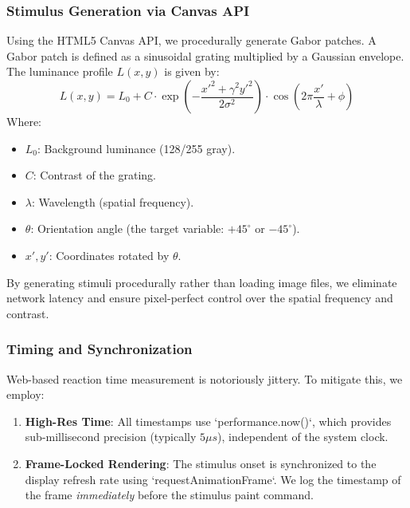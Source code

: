 \documentclass[journal]{IEEEtran}
\begin{document}
\subsubsection{Stimulus Generation via Canvas API}
Using the HTML5 Canvas API, we procedurally generate Gabor patches. A Gabor patch is defined as a sinusoidal grating multiplied by a Gaussian envelope.
The luminance profile $L(x,y)$ is given by:
\begin{equation}
    L(x,y) = L_0 + C \cdot \exp\left(-\frac{x'^2 + \gamma^2 y'^2}{2\sigma^2}\right) \cdot \cos\left(2\pi \frac{x'}{\lambda} + \phi\right)
\end{equation}
Where:
\begin{itemize}
    \item $L_0$: Background luminance (128/255 gray).
    \item $C$: Contrast of the grating.
    \item $\lambda$: Wavelength (spatial frequency).
    \item $\theta$: Orientation angle (the target variable: $+45^\circ$ or $-45^\circ$).
    \item $x', y'$: Coordinates rotated by $\theta$.
\end{itemize}
By generating stimuli procedurally rather than loading image files, we eliminate network latency and ensure pixel-perfect control
over the spatial frequency and contrast.

\subsubsection{Timing and Synchronization}
Web-based reaction time measurement is notoriously jittery. To mitigate this, we employ:
\begin{enumerate}
    \item \textbf{High-Res Time}: All timestamps use `performance.now()`, which provides sub-millisecond precision (typically $5\mu s$), independent of the system clock.
    \item \textbf{Frame-Locked Rendering}: The stimulus onset is synchronized to the display refresh rate using `requestAnimationFrame`.
    We log the timestamp of the frame \textit{immediately} before the stimulus paint command.
\end{enumerate}
\end{document}
